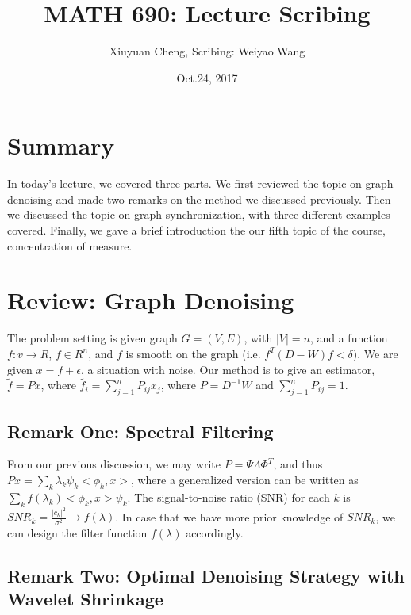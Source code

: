 \documentclass[11pt,letter]{article}
\begin{document}
\title{MATH 690: Lecture Scribing}

\author{Xiuyuan Cheng, Scribing: Weiyao Wang}

\date{Oct.24, 2017}

\maketitle

\section{Summary}

In today's lecture, we covered three parts. We first reviewed the topic on graph denoising and made two remarks on the method we discussed previously. Then we discussed the topic on graph synchronization, with three different examples covered. Finally, we gave a brief introduction the our fifth topic of the course, concentration of measure.

\section{Review: Graph Denoising}

The problem setting is given graph $G=(V,E)$, with $|V|=n$, and a function $f: v\to R$, $f\in R^n$, and $f$ is smooth on the graph (i.e. $f^T(D-W)f < \delta$). We are given $x=f+\epsilon$, a situation with noise. Our method is to give an estimator, $\tilde{f}=Px$, where $\tilde{f_i}=\sum_{j=1}^n P_{ij}x_j$, where $P=D^{-1}W$ and $\sum_{j=1}^nP_{ij}=1$.

\subsection{Remark One: Spectral Filtering}

From our previous discussion, we may write $P=\Psi \Lambda \Phi^T$, and thus $Px=\sum_{k} \lambda_k \psi_k <\phi_k,x>$, where a generalized version can be written as $\sum_k f(\lambda_k)<\phi_k,x>\psi_k$. The signal-to-noise ratio (SNR) for each $k$ is $SNR_k=\frac{|c_k|^2}{\sigma^2} \to f(\lambda)$. In case that we have more prior knowledge of $SNR_k$, we can design the filter function $f(\lambda)$ accordingly. 

\subsection{Remark Two: Optimal Denoising Strategy with Wavelet Shrinkage}
\end{document}
